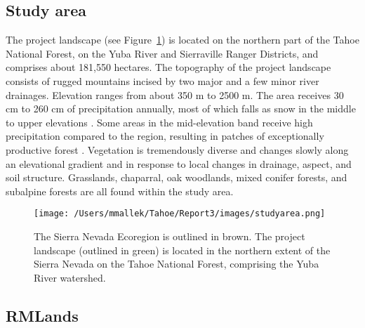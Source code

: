 \subsection*{Study area}
The project landscape (see Figure~\ref{projectarea}) is located on the northern part of the Tahoe National Forest, on the Yuba River and Sierraville Ranger Districts, and comprises about 181,550 hectares. The topography of the project landscape consists of rugged mountains incised by two major and a few minor river drainages. Elevation ranges from about 350 m to 2500 m. The area receives 30 cm to 260 cm of precipitation annually, most of which falls as snow in the middle to upper elevations \citep{Storer1963}. Some areas in the mid-elevation band receive high precipitation compared to the region, resulting in patches of exceptionally productive forest \citep{Littell2012}. Vegetation is tremendously diverse and changes slowly along an elevational gradient and in response to local changes in drainage, aspect, and soil structure. Grasslands, chaparral, oak woodlands, mixed conifer forests, and subalpine forests are all found within the study area. 

\begin{figure}
\centering
\texttt{[image: /Users/mmallek/Tahoe/Report3/images/studyarea.png]}
\caption{The Sierra Nevada Ecoregion is outlined in brown. The project landscape (outlined in green) is located in the northern extent of the Sierra Nevada on the Tahoe National Forest, comprising the Yuba River watershed.}
\label{projectarea}
\end{figure}


\subsection{RMLands}

